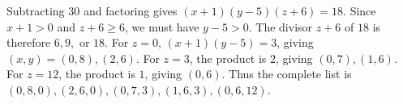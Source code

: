 Subtracting $30$ and factoring gives $(x+1)(y-5)(z+6)=18$. Since $x+1>0$ and $z+6\ge6$, we must have $y-5>0$. The divisor $z+6$ of $18$ is therefore $6,9,$ or $18$. For $z=0$, $(x+1)(y-5)=3$, giving $(x,y)=(0,8),(2,6)$. For $z=3$, the product is $2$, giving $(0,7),(1,6)$. For $z=12$, the product is $1$, giving $(0,6)$. Thus the complete list is $\boxed{(0,8,0),(2,6,0),(0,7,3),(1,6,3),(0,6,12)}$.
